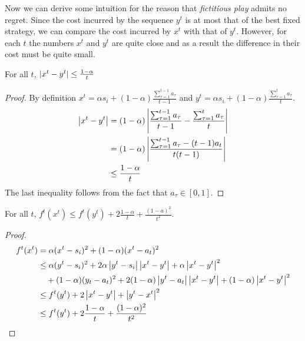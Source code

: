 Now we can derive some intuition for the reason that \emph{fictitious play} admits
no regret. Since the cost incurred by the sequence $y^t$ is at most that of the best
fixed strategy, we can compare the cost incurred by $x^t$ with that of $y^t$.
However, for each $t$ the numbers $x^t$ and $y^t$ are quite close and as a result
the difference in their cost must be quite small.
\begin{lemma}
  For all $t$, $\left|x^t - y^t \right| \leq \frac{1-\alpha}{t}$
\end{lemma}
\begin{proof}
  By definition $x^t = \alpha s_i + (1-\alpha)\frac{\sum_{\tau = 1}^{t-1} a_\tau}{t-1}$
  and $ y^t = \alpha s_i + (1-\alpha)\frac{\sum_{\tau = 1}^t a_\tau}{t}$.
  \begin{align*}
    \left|x^t - y^t\right|
    &=
    (1-\alpha)\left|\frac{\sum_{\tau = 1}^{t-1}a_\tau}{t-1}
    - \frac{\sum_{\tau = 1}^t a_\tau}{t}\right|\\
    &=
    (1-\alpha)\left|\frac{\sum_{\tau = 1}^{t-1}a_\tau -(t-1)a_t}{t(t-1)}\right|\\
    &\leq
    \frac{1-\alpha}{t}
  \end{align*}
  The last inequality follows from the fact that $a_\tau \in [0,1]$.
\end{proof}

\begin{lemma}
  For all $t$, $f^t(x^t) \leq f^t(y^t) + 2\frac{1-\alpha}{t} + \frac{(1-a)^2}{t^2}$.
\end{lemma}
\begin{proof}
  \begin{align*}
    f^t(x^t)
    &=
    \alpha(x^t - s_i)^2 + (1 - \alpha)(x^t - a_t)^2 \\
    &\leq
    \alpha(y^t - s_i)^2 + 2\alpha\left|y^t -
    s_i\right|\left|x^t - y^t\right| + \alpha \left|x^t - y^t\right|^2 \\
    &\quad + (1-\alpha)(y_t - a_t)^2 +
    2(1-\alpha)\left|y^t - a_t\right|\left|x^t-y^t\right| + (1 - \alpha)\left|x^t - y^t\right|^2\\
    &\leq
    f^t(y^t) + 2\left|x^t - y^t\right| + \left|y^t - x^t\right|^2\\
    &\leq
    f^t(y^t) + 2\frac{1-\alpha}{t} + \frac{(1-\alpha)^2}{t^2}
  \end{align*}
\end{proof}
